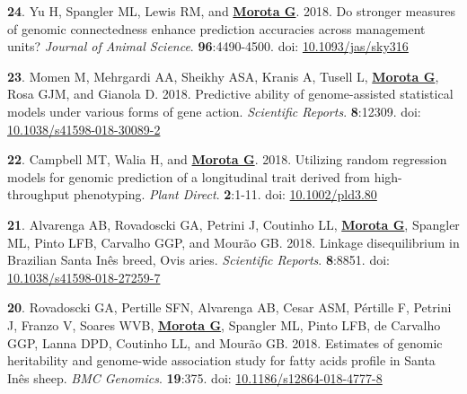 \documentclass[margin,line,10pt]{res}
\newenvironment{list1}{
  \begin{list}{\ding{113}}{%
      \setlength{\itemsep}{0in}
      \setlength{\parsep}{0in} \setlength{\parskip}{0in}
      \setlength{\topsep}{0in} \setlength{\partopsep}{0in} 
      \setlength{\leftmargin}{0.17in}}}{\end{list}}
\begin{document}
\begin{resume}
\begin{list1}
  \vspace{0.5cm}
  
\item  [{\bf 24}.] Yu H, Spangler ML, Lewis RM, and {\bf \underline{Morota G}}. 2018.  Do stronger measures of genomic connectedness enhance prediction accuracies across management units? \emph{Journal of Animal Science}. \textbf{96}:4490-4500.  doi: \textcolor{blue}{\href{https://doi.org/10.1093/jas/sky316}{10.1093/jas/sky316}} 

  \vspace{0.5cm}

\item  [{\bf 23}.] Momen M, Mehrgardi AA, Sheikhy ASA, Kranis A, Tusell L, \textbf{\underline{Morota G}}, Rosa GJM, and Gianola D. 2018. Predictive ability of genome-assisted statistical models under various forms of gene action. \emph{Scientific Reports}. \textbf{8}:12309. doi: \textcolor{blue}{\href{https://doi.org/10.1038/s41598-018-30089-2}{10.1038/s41598-018-30089-2}} 

  \vspace{0.5cm}

\item [{\bf 22}.] Campbell MT, Walia H, and \textbf{\underline{Morota G}}. 2018. Utilizing random regression models for genomic prediction of a longitudinal trait derived from high-throughput phenotyping. \emph{Plant Direct}. \textbf{2}:1-11. doi: \textcolor{blue}{\href{https://doi.org/10.1002/pld3.80}{10.1002/pld3.80}} 
  
  \vspace{0.5cm}

\item  [{\bf 21}.] Alvarenga AB, Rovadoscki GA, Petrini J, Coutinho LL, \textbf{\underline{Morota G}}, Spangler ML, Pinto LFB, Carvalho GGP, and Mour{\~a}o GB. 2018. Linkage disequilibrium in Brazilian Santa  In{\^e}s breed, Ovis aries. \emph{Scientific Reports}.  \textbf{8}:8851. doi: \textcolor{blue}{\href{https://doi.org/10.1038/s41598-018-27259-7}{10.1038/s41598-018-27259-7}} 

  \vspace{0.5cm}
  
\item  [{\bf 20}.] Rovadoscki GA, Pertille SFN, Alvarenga AB,  Cesar ASM, P{\'e}rtille F, Petrini J, Franzo V, Soares WVB, \textbf{\underline{Morota G}}, Spangler ML, Pinto LFB, de Carvalho GGP, Lanna DPD, Coutinho LL, and Mour{\~a}o GB. 2018. Estimates of genomic heritability and genome-wide association study for fatty acids profile in Santa In{\^e}s sheep. \emph{BMC Genomics}. \textbf{19}:375. doi: \textcolor{blue}{\href{https://doi.org/10.1186/s12864-018-4777-8}{10.1186/s12864-018-4777-8}} 
    

\end{list1}
\end{resume}
\end{document}
